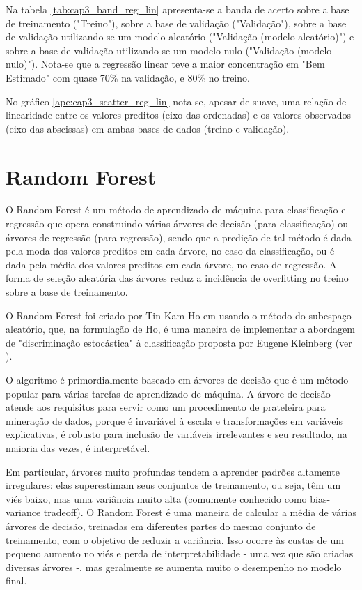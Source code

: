 Na tabela \ref{tab:cap3_band_reg_lin} apresenta-se a banda de acerto sobre a base de treinamento ("Treino"), sobre a base de validação ("Validação"), sobre a base de validação utilizando-se um modelo aleatório ("Validação (modelo aleatório)") e sobre a base de validação utilizando-se um modelo nulo ("Validação (modelo nulo)"). Nota-se que a regressão linear teve a maior concentração em "Bem Estimado" com quase 70\% na validação, e 80\% no treino.

No gráfico \ref{ape:cap3_scatter_reg_lin} nota-se, apesar de suave, uma relação de linearidade entre os valores preditos (eixo das ordenadas) e os valores observados (eixo das abscissas) em ambas bases de dados (treino e validação).

\section{Random Forest}
\label{sec:random_forest}

O Random Forest é um método de aprendizado de máquina para classificação e regressão que opera construindo várias árvores de decisão (para classificação) ou árvores de regressão (para regressão), sendo que a predição de tal método é dada pela moda dos valores preditos em cada árvore, no caso da classificação, ou é dada pela média dos valores preditos em cada árvore, no caso de regressão. A forma de seleção aleatória das árvores reduz a incidência de overfitting no treino sobre a base de treinamento.

O Random Forest foi criado por Tin Kam Ho em \citet{Ho1995} usando o método do subespaço aleatório, que, na formulação de Ho, é uma maneira de implementar a abordagem de "discriminação estocástica" à classificação proposta por Eugene Kleinberg (ver \citet{Kleinberg1990}).

O algoritmo é primordialmente baseado em árvores de decisão que é um método popular para várias tarefas de aprendizado de máquina. A árvore de decisão atende aos requisitos para servir como um procedimento de prateleira para mineração de dados, porque é invariável à escala e transformações em variáveis explicativas, é robusto para inclusão de variáveis irrelevantes e seu resultado, na maioria das vezes, é interpretável.

Em particular, árvores muito profundas tendem a aprender padrões altamente irregulares: elas superestimam seus conjuntos de treinamento, ou seja, têm um viés baixo, mas uma variância muito alta (comumente conhecido como bias-variance tradeoff). O Random Forest é uma maneira de calcular a média de várias árvores de decisão, treinadas em diferentes partes do mesmo conjunto de treinamento, com o objetivo de reduzir a variância. Isso ocorre às custas de um pequeno aumento no viés e perda de interpretabilidade - uma vez que são criadas diversas árvores -, mas geralmente se aumenta muito o desempenho no modelo final.

